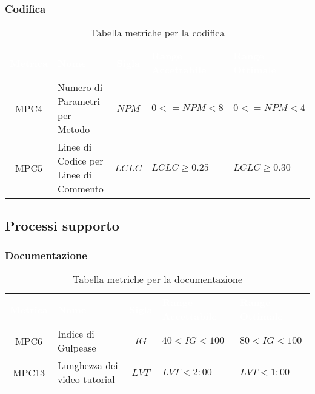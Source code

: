 \subsubsection{Codifica}
     \renewcommand{\arraystretch}{1.5}
     \begin{longtable}{ c C{4cm} c C{3.5cm} C{3.5cm}}
     	\caption{Tabella metriche per la codifica}\\
     	\textcolor{white}{\textbf{Metrica}} & \textcolor{white}{\textbf{Nome}} & \textcolor{white}{\textbf{Sigla}} & \textcolor{white}{\textbf{Range Accettabile}} & \textcolor{white}{\textbf{Range Ottimale}}\\
		MPC4 & Numero di Parametri per Metodo & $NPM$ & $0 <= NPM < 8$ & $ 0 <= NPM < 4$ \\
		MPC5 & Linee di Codice per Linee di Commento & $LCLC$ & $LCLC \geq 0.25$ & $LCLC \geq 0.30$ \\
	\end{longtable}

\newpage
\subsection{Processi supporto}

\subsubsection{Documentazione}
    \renewcommand{\arraystretch}{1.5}
    \begin{longtable}{ c C{4cm} c C{3.5cm} C{3.5cm}}
    	\caption{Tabella metriche per la documentazione}\\
    	\textcolor{white}{\textbf{Metrica}} & \textcolor{white}{\textbf{Nome}} & \textcolor{white}{\textbf{Sigla}} & \textcolor{white}{\textbf{Range Accettabile}} & \textcolor{white}{\textbf{Range Ottimale}}\\
		MPC6 & Indice di Gulpease & $IG$ & $40 < IG < 100$ & $80 < IG < 100$ \\
		MPC13 & Lunghezza dei video tutorial & $LVT$ & $LVT < 2:00$ & $LVT < 1:00$ \\
    \end{longtable}
\vspace{0.3cm}
